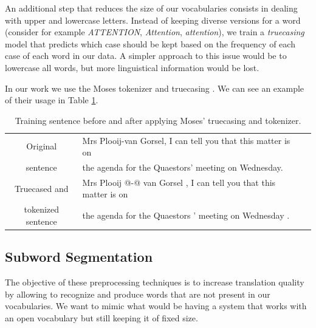 \documentclass[11pt,english,listoffigures,listoftables]{tfgetsinf}
\begin{document}


An additional step that reduces the size of our vocabularies consists in dealing with upper and lowercase letters. Instead of keeping diverse versions for a word (consider for example \textit{ATTENTION}, \textit{Attention}, \textit{attention}), we train a \textit{truecasing} model that predicts which case should be kept based on the frequency of each case of each word in our data. 
A simpler approach to this issue would be to lowercase all words, but more linguistical information would be lost.

In our work we use the Moses tokenizer and truecasing \cite{koehn-etal-2007-moses}. We can see an example of their usage in Table \ref{table:truec}.




\begin{table}
    \caption{Training sentence before and after applying Moses' truecasing and tokenizer.}
\centering
\begin{tabular}{|c|l|c}
\hline
    Original & Mrs Plooij-van Gorsel, I can tell you that this matter is on  \\
    
    sentence & the agenda for the Quaestors' meeting on Wednesday.\\
\hline
    Truecased and & Mrs Plooij @-@ van Gorsel , I can tell you that this matter is on\\
    tokenized sentence & the agenda for the Quaestors ' meeting on Wednesday .\\
\hline
\end{tabular}
\label{table:truec}
\end{table}


\subsection{Subword Segmentation}\label{subw}
The objective of these preprocessing techniques is to increase translation quality by allowing to recognize and produce words that are not present in our vocabularies.
We want to mimic what would be having a system that works with an open vocabulary but still keeping it of fixed size.
\end{document}
